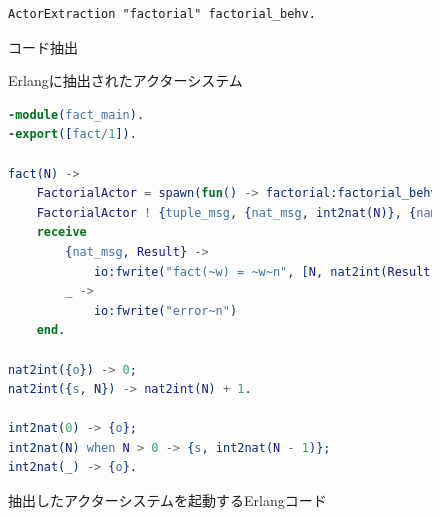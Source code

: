 \begin{figure}[tp]
\begin{lstlisting}
ActorExtraction "factorial" factorial_behv.
\end{lstlisting}
\caption{コード抽出}\label{code:overview:extraction}
\end{figure}

\begin{figure}
  
  \caption{Erlangに抽出されたアクターシステム}\label{code:overview:fact-impl-erl}
\end{figure}

\begin{figure}
\begin{lstlisting}[language=Erlang]
-module(fact_main).
-export([fact/1]).

fact(N) ->
    FactorialActor = spawn(fun() -> factorial:factorial_behv({tt}) end),
    FactorialActor ! {tuple_msg, {nat_msg, int2nat(N)}, {name_msg, self()}},
    receive
        {nat_msg, Result} ->
            io:fwrite("fact(~w) = ~w~n", [N, nat2int(Result)]);
        _ ->
            io:fwrite("error~n")
    end.

nat2int({o}) -> 0;
nat2int({s, N}) -> nat2int(N) + 1.

int2nat(0) -> {o};
int2nat(N) when N > 0 -> {s, int2nat(N - 1)};
int2nat(_) -> {o}.
\end{lstlisting}
\caption{抽出したアクターシステムを起動するErlangコード}\label{code:overview:run}
\end{figure}
